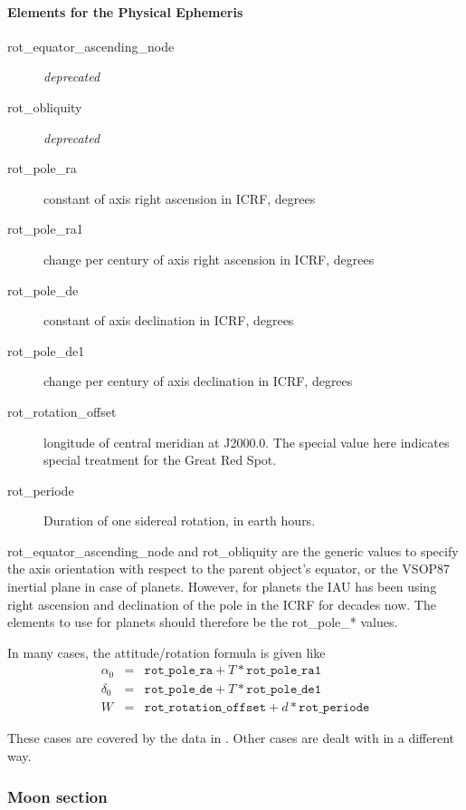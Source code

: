 \paragraph{Elements for the Physical Ephemeris}

\begin{description}
\item[rot\_equator\_ascending\_node] \emph{deprecated}
\item[rot\_obliquity] \emph{deprecated}
\item[rot\_pole\_ra]  constant of axis right ascension in ICRF, degrees
\item[rot\_pole\_ra1] change per century of axis right ascension in ICRF, degrees
\item[rot\_pole\_de] constant of axis declination in ICRF, degrees
\item[rot\_pole\_de1] change per century of axis declination in ICRF, degrees
\item[rot\_rotation\_offset] longitude of central meridian at J2000.0. 
                             The special value here indicates special treatment for the Great Red Spot.
\item[rot\_periode] Duration of one sidereal rotation, in earth hours.
\end{description}

rot\_equator\_ascending\_node and rot\_obliquity are the generic
values to specify the axis orientation with respect to the parent
object's equator, or the VSOP87 inertial plane in case of planets. However,
for planets the IAU has been using right ascension and declination of
the pole in the ICRF for decades now. The elements to use for planets
should therefore be the rot\_pole\_* values.

In many cases, the attitude/rotation formula is given like
\begin{eqnarray}
  \label{eq:PlanetOrientation}
  \alpha_0 &=& \mathtt{rot\_pole\_ra} + T * \mathtt{rot\_pole\_ra1}\\
  \delta_0 &=& \mathtt{rot\_pole\_de} + T * \mathtt{rot\_pole\_de1}\\
  W        &=& \mathtt{rot\_rotation\_offset} + d * \mathtt{rot\_periode}
\end{eqnarray}

These cases are covered by the data in . Other cases are dealt with in a different way.


\subsubsection{Moon section}
\label{sec:ssystem.ini:Moon}

